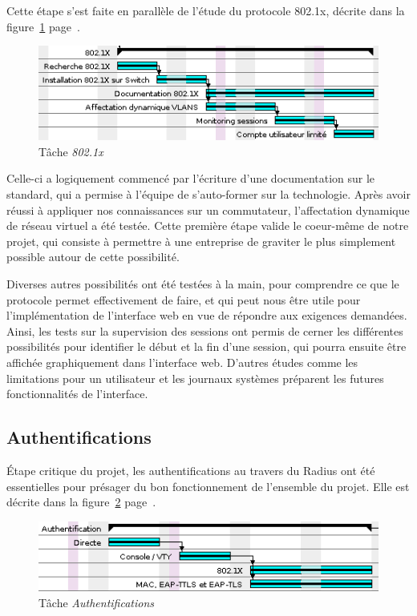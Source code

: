 Cette étape s'est faite en parallèle de l'étude du protocole 802.1x, décrite dans la figure~\ref{gantt_dot1x} page~\pageref{gantt_dot1x}.

\begin{figure}[!h]
	\begin{center}
		\includegraphics[width=350pt]{img/gantt_dot1x.png}
	\end{center}
	\caption{Tâche \textit{802.1x}}
	\label{gantt_dot1x}
\end{figure}

Celle-ci a logiquement commencé par l'écriture d'une documentation sur le standard, qui a permise à l'équipe de s'auto-former sur la technologie. Après avoir réussi à appliquer nos connaissances sur un commutateur, l'affectation dynamique de réseau virtuel a été testée. Cette première étape valide le coeur-même de notre projet, qui consiste à permettre à une entreprise de graviter le plus simplement possible autour de cette possibilité.

Diverses autres possibilités ont été testées à la main, pour comprendre ce que le protocole permet effectivement de faire, et qui peut nous être utile pour l'implémentation de l'interface web en vue de répondre aux exigences demandées. Ainsi, les tests sur la supervision des sessions ont permis de cerner les différentes possibilités pour identifier le début et la fin d'une session, qui pourra ensuite être affichée graphiquement dans l'interface web. D'autres études comme les limitations pour un utilisateur et les journaux systèmes préparent les futures fonctionnalités de l'interface.

\subsection{Authentifications}

Étape critique du projet, les authentifications au travers du Radius ont été essentielles pour présager du bon fonctionnement de l'ensemble du projet. Elle est décrite dans la figure~\ref{gantt_auth} page~\pageref{gantt_auth}.

\begin{figure}[!h]
	\begin{center}
		\includegraphics[width=350pt]{img/gantt_auth.png}
	\end{center}
	\caption{Tâche \textit{Authentifications}}
	\label{gantt_auth}
\end{figure}

